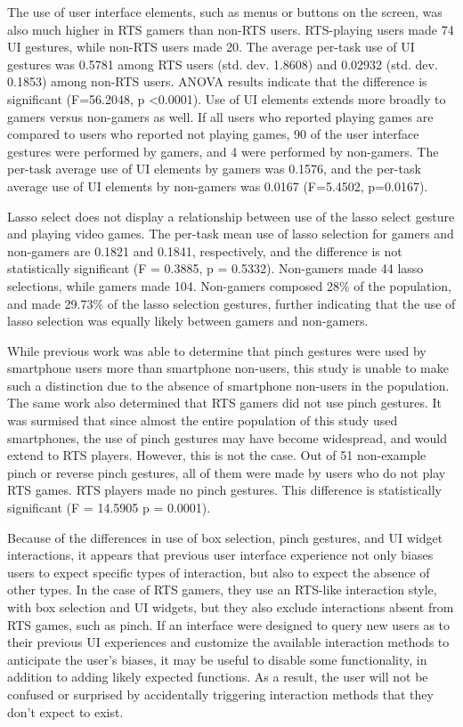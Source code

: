 The use of user interface elements, such as menus or buttons on the screen, was also much higher in RTS gamers than non-RTS users. 
RTS-playing users made 74 UI gestures, while non-RTS users made 20. 
The average per-task use of UI gestures was 0.5781 among RTS users (std. dev. 1.8608) and 0.02932 (std. dev. 0.1853) among non-RTS users. 
ANOVA results indicate that the difference is significant (F=56.2048, p \textless 0.0001).
Use of UI elements extends more broadly to gamers versus non-gamers as well. 
If all users who reported playing games are compared to users who reported not playing games, 90 of the user interface gestures were performed by gamers, and 4 were performed by non-gamers. 
The per-task average use of UI elements by gamers was 0.1576, and the per-task average use of UI elements by non-gamers was 0.0167 (F=5.4502, p=0.0167).

Lasso select does not display a relationship between use of the lasso select gesture and playing video games. 
The per-task mean use of lasso selection for gamers and non-gamers are 0.1821 and 0.1841, respectively, and the difference is not statistically significant (F = 0.3885, p = 0.5332).
Non-gamers made 44 lasso selections, while gamers made 104.
Non-gamers composed 28\% of the population, and made 29.73\% of the lasso selection gestures, further indicating that the use of lasso selection was equally likely between gamers and non-gamers. 

While previous work was able to determine that pinch gestures were used by smartphone users more than smartphone non-users, this study is unable to make such a distinction due to the absence of smartphone non-users in the population.  
The same work also determined that RTS gamers did not use pinch gestures.
It was surmised that since almost the entire population of this study used smartphones, the use of pinch gestures may have become widespread, and would extend to RTS players. 
However, this is not the case. 
Out of 51 non-example pinch or reverse pinch gestures, all of them were made by users who do not play RTS games.
RTS players made no pinch gestures.
This difference is statistically significant (F = 14.5905 p = 0.0001).

Because of the differences in use of box selection, pinch gestures, and UI widget interactions, it appears that previous user interface experience not only biases users to expect specific types of interaction, but also to expect the absence of other types. 
In the case of RTS gamers, they use an RTS-like interaction style, with box selection and UI widgets, but they also exclude interactions absent from RTS games, such as pinch. 
If an interface were designed to query new users as to their previous UI experiences and customize the available interaction methods to anticipate the user's biases, it may be useful to disable some functionality, in addition to adding likely expected functions. 
As a result, the user will not be confused or surprised by accidentally triggering interaction methods that they don't expect to exist.

